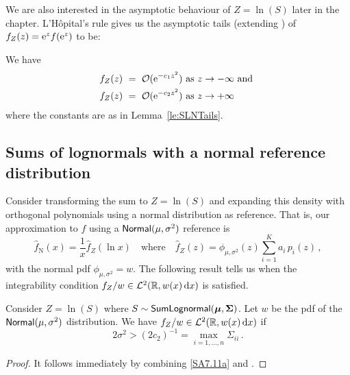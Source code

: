 We are also interested in the asymptotic behaviour of $Z = \ln(S)$ later in the chapter. L'H\^opital's rule gives us the asymptotic tails (extending \cite{gao2009asymptotic}) of $f_Z(z) = \mathrm{e}^{z}f(\mathrm{e}^{z})$ to be:

\begin{corollary} \label{co:LogSLNTails}
We have
\begin{align} \label{LogSLNLeftTail}
	f_Z(z)  \ &=\  {\mathcal{O}}(\mathrm{e}^{-c_1 z^2} ) \text{\ as } z\to -\infty
	 \text{ and } \\
 \label{LogSLNRightTail}
	f_Z(z) \ &=\ {\mathcal{O}}(\mathrm{e}^{-c_2 z^2}) \text{\ as } z \to +\infty
\end{align}
where the constants are as in Lemma~\ref{le:SLNTails}.
\end{corollary}

\subsection{Sums of lognormals with a normal reference distribution} \label{SS:LNNormalNu}

Consider transforming the sum to $Z=\ln(S)$ and expanding this density with orthogonal polynomials using a normal distribution as reference. That is, our approximation to $f$ using a $\mathsf{Normal}(\mu, \sigma^2)$ reference is
\[ \widehat{f}_{\mathrm{N}}(x) = \frac{1}{x} \widehat{f}_{Z}\left(\ln x \right) \quad\text{where}\quad \widehat{f}_{Z}(z) = \phi_{\mu,\sigma^2}(z) \sum_{i=1}^K a_i \, p_i(z) \,, \]
with  the normal pdf $\phi_{\mu,\sigma^2}=w$. The following result tells us when the integrability condition $f_{Z}/w \in\mathcal{L}^2(\mathbb{R}, w(x) \mathop{}\!\mathrm{d} x)$ is satisfied.


\begin{proposition}\label{eq:IntegrabilityConditionNormalHermiteExpansion}
Consider $Z=\ln(S)$ where $S \sim \mathsf{SumLognormal}(\bm{\mu},\bm{\Sigma})$. Let $w$ be the pdf of the $\mathsf{Normal}(\mu,\sigma^2)$ distribution. We have $f_Z / w \in\mathcal{L}^2(\mathbb{R}, w(x) \mathop{}\!\mathrm{d} x)$ if
\begin{equation} \label{normal_int_cond_1}
	2 \sigma^2 > (2 c_2)^{-1} = \max_{i=1,\dots,n} \Sigma_{ii} \,.
\end{equation}
\end{proposition}

\begin{proof}
It follows immediately by combining \eqref{SA7.11a} and .
\end{proof}


